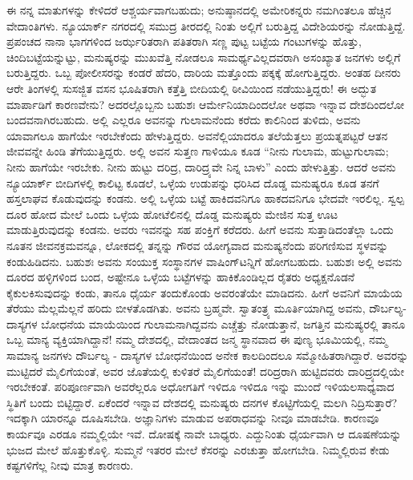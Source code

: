 ಈ ನನ್ನ ಮಾತುಗಳನ್ನು ಕೇಳಿದರೆ ಆಶ್ಚರ್ಯವಾಗಬಹುದು; ಅನುಷ್ಠಾನದಲ್ಲಿ ಅಮೇರಿಕನ್ನರು ನಮಗಿಂತಲೂ ಹೆಚ್ಚಿನ ವೇದಾಂತಿಗಳು. ನ್ಯೂಯಾರ್ಕ್​ ನಗರದಲ್ಲಿ ಸಮುದ್ರ ತೀರದಲ್ಲಿ ನಿಂತು ಅಲ್ಲಿಗೆ ಬರುತ್ತಿದ್ದ ವಿದೇಶಿಯರನ್ನು ನೋಡುತ್ತಿದ್ದೆ. ಪ್ರಪಂಚದ ನಾನಾ ಭಾಗಗಳಿಂದ ಜರ್ಝರಿತರಾಗಿ ಪತಿತರಾಗಿ ಸಣ್ಣ ಪುಟ್ಟ ಬಟ್ಟೆಯ ಗಂಟುಗಳನ್ನು ಹೊತ್ತು, ಚಿಂದಿಬಟ್ಟೆಯನ್ನುಟ್ಟು, ಮನುಷ್ಯರನ್ನು ಮುಖವೆತ್ತಿ ನೋಡಲೂ ಸಾಮರ್ಥ್ಯವಿಲ್ಲದವರಾಗಿ ಅಸಂಖ್ಯಾತ ಜನಗಳು ಅಲ್ಲಿಗೆ ಬರುತ್ತಿದ್ದರು. ಒಬ್ಬ ಪೋಲೀಸರನ್ನು ಕಂಡರೆ ಹೆದರಿ, ದಾರಿಯ ಮತ್ತೊಂದು ಪಕ್ಕಕ್ಕೆ ಹೋಗುತ್ತಿದ್ದರು. ಅಂತಹ ದೀನರು ಆರೇ ತಿಂಗಳಲ್ಲಿ ಸುಸಜ್ಜಿತ ವಸನ ಭೂಷಿತರಾಗಿ ಕತ್ತೆತ್ತಿ ಬೀದಿಯಲ್ಲಿ ಠೀವಿಯಿಂದ ನಡೆಯುತ್ತಿದ್ದರು! ಈ ಅದ್ಭುತ ಮಾರ್ಪಾಡಿಗೆ ಕಾರಣವೇನು? ಅದರಲ್ಲೊಬ್ಬನು ಬಹುಶಃ ಆರ್ಮೇನಿಯಾದಿಂದಲೋ ಅಥವಾ ಇನ್ನಾವ ದೇಶದಿಂದಲೋ ಬಂದವನಾಗಿರಬಹುದು. ಅಲ್ಲಿ ಎಲ್ಲರೂ ಅವನನ್ನು ಗುಲಾಮನೆಂದು ಕರೆದು ಕಾಲಿನಿಂದ ತುಳಿದು, ಅವನು ಯಾವಾಗಲೂ ಹಾಗೆಯೇ ಇರಬೇಕೆಂದು ಹೇಳುತ್ತಿದ್ದರು. ಅವನೆಲ್ಲಿಯಾದರೂ ತಲೆಯೆತ್ತಲು ಪ್ರಯತ್ನಪಟ್ಟರೆ ಆತನ ಜೀವವನ್ನೇ ಹಿಂಡಿ ತೆಗೆಯುತ್ತಿದ್ದರು. ಅಲ್ಲಿ ಅವನ ಸುತ್ತಣ ಗಾಳಿಯೂ ಕೂಡ “ನೀನು ಗುಲಾಮ, ಹುಟ್ಟುಗುಲಾಮ; ನೀನು ಹಾಗೆಯೇ ಇರಬೇಕು. ನೀನು ಹುಟ್ಟು ದರಿದ್ರ, ದಾರಿದ್ರ್ಯವೇ ನಿನ್ನ ಬಾಳು” ಎಂದು ಹೇಳುತ್ತಿತ್ತು. ಆದರೆ ಅವನು ನ್ಯೂಯಾರ್ಕ್​ ಬೀದಿಗಳಲ್ಲಿ ಕಾಲಿಟ್ಟ ಕೂಡಲೆ, ಒಳ್ಳೆಯ ಉಡುಪನ್ನು ಧರಿಸಿದ ದೊಡ್ಡ ಮನುಷ್ಯರೂ ಕೂಡ ತನಗೆ ಹಸ್ತಲಾಘವ ಕೊಡುವುದನ್ನು ಕಂಡನು. ಅಲ್ಲಿ ಒಳ್ಳೆಯ ಬಟ್ಟೆ ಹಾಕಿದವನಿಗೂ ಹಾಕದವನಿಗೂ ಭೇದವೇ ಇರಲಿಲ್ಲ. ಸ್ವಲ್ಪ ದೂರ ಹೋದ ಮೇಲೆ ಒಂದು ಒಳ್ಳೆಯ ಹೋಟೆಲಿನಲ್ಲಿ ದೊಡ್ಡ ಮನುಷ್ಯರು ಮೇಜಿನ ಸುತ್ತ ಊಟ ಮಾಡುತ್ತಿರುವುದನ್ನು ಕಂಡನು. ಅವರು ಇವನನ್ನು ಸಹ ಪಂಕ್ತಿಗೆ ಕರೆದರು. ಹೀಗೆ ಅವನು ಸುತ್ತಾಡಿದಂತೆಲ್ಲಾ ಒಂದು ನೂತನ ಜೀವನಕ್ರಮವನ್ನೂ, ಲೋಕದಲ್ಲಿ ತನ್ನನ್ನು ಗೌರವ ಯೋಗ್ಯವಾದ ಮನುಷ್ಯನೆಂದು ಪರಿಗಣಿಸುವ ಸ್ಥಳವನ್ನು ಕಂಡುಹಿಡಿದನು. ಬಹುಶಃ ಅವನು ಸಂಯುಕ್ತ ಸಂಸ್ಥಾನಗಳ ವಾಷಿಂಗ್​ಟನ್ನಿಗೆ ಹೋಗಬಹುದು. ಬಹುಶಃ ಅಲ್ಲಿ ಅವನು ದೂರದ ಹಳ್ಳಿಗಳಿಂದ ಬಂದ, ಅಷ್ಟೇನೂ ಒಳ್ಳೆಯ ಬಟ್ಟೆಗಳನ್ನು ಹಾಕಿಕೊಂಡಿಲ್ಲದ ರೈತರು ಅಧ್ಯಕ್ಷನೊಡನೆ ಕೈಕುಲಕಿಸುವುದನ್ನು ಕಂಡು, ತಾನೂ ಧೈರ್ಯ ತಂದುಕೊಂಡು ಅವರಂತೆಯೇ ಮಾಡಿದನು. ಹೀಗೆ ಅವನಿಗೆ ಮಾಯೆಯ ತೆರೆಯು ಮೆಲ್ಲಮೆಲ್ಲನೆ ಹರಿದು ಬೀಳತೊಡಗಿತು. ಅವನು ಬ್ರಹ್ಮವೇ. ಸ್ವಾತಂತ್ರ್ಯ ಮೂರ್ತಿಯಾಗಿದ್ದ ಅವನು, ದೌರ್ಬಲ್ಯ-ದಾಸ್ಯಗಳ ಬೋಧನೆಯ ಮಾಯೆಯಿಂದ ಗುಲಾಮನಾಗಿದ್ದವನು ಎಚ್ಚೆತ್ತು ನೋಡುತ್ತಾನೆ, ಜಗತ್ತಿನ ಮನುಷ್ಯರಲ್ಲಿ ತಾನೂ ಒಬ್ಬ ಮಾನ್ಯ ವ್ಯಕ್ತಿಯಾಗಿದ್ದಾನೆ! ನಮ್ಮ ದೇಶದಲ್ಲಿ, ವೇದಾಂತದ ಜನ್ಮ ಸ್ಥಾನವಾದ ಈ ಪುಣ್ಯ ಭೂಮಿಯಲ್ಲಿ, ನಮ್ಮ ಸಾಮಾನ್ಯ ಜನಗಳು ದೌರ್ಬಲ್ಯ - ದಾಸ್ಯಗಳ ಬೋಧನೆಯಿಂದ ಅನೇಕ ಕಾಲದಿಂದಲೂ ಸಮ್ಮೋಹಿತರಾಗಿದ್ದಾರೆ. ಅವರನ್ನು ಮುಟ್ಟಿದರೆ ಮೈಲಿಗೆಯಂತೆ, ಅವರ ಜೊತೆಯಲ್ಲಿ ಕುಳಿತರೆ ಮೈಲಿಗೆಯಂತೆ! ದರಿದ್ರರಾಗಿ ಹುಟ್ಟಿದವರು ದಾರಿದ್ರ್ಯದಲ್ಲಿಯೇ ಇರಬೇಕಂತೆ. ಪರಿಪೂರ್ಣವಾಗಿ ಅವರೆಲ್ಲರೂ ಅಧೋಗತಿಗೆ ಇಳಿದೂ ಇಳಿದೂ ಇನ್ನು ಮುಂದೆ ಇಳಿಯಲಸಾಧ್ಯವಾದ ಸ್ಥಿತಿಗೆ ಬಂದು ಬಿಟ್ಟಿದ್ದಾರೆ. ಏಕೆಂದರೆ ಇನ್ನಾವ ದೇಶದಲ್ಲಿ ಮನುಷ್ಯರು ದನಗಳ ಕೊಟ್ಟಿಗೆಯಲ್ಲಿ ಮಲಗಿ ನಿದ್ರಿಸುತ್ತಾರೆ? ಇದಕ್ಕಾಗಿ ಯಾರನ್ನೂ ದೂಷಿಸಬೇಡಿ. ಅಜ್ಞಾನಿಗಳು ಮಾಡುವ ಅಪರಾಧವನ್ನು ನೀವೂ ಮಾಡಬೇಡಿ. ಕಾರಣವೂ ಕಾರ್ಯವೂ ಎರಡೂ ನಮ್ಮಲ್ಲಿಯೇ ಇವೆ. ದೋಷಕ್ಕೆ ನಾವೇ ಬಾಧ್ಯರು. ಎದ್ದುನಿಂತು ಧೈರ್ಯವಾಗಿ ಆ ದೂಷಣೆಯನ್ನು ಭುಜದ ಮೇಲೆ ಹೊತ್ತುಕೊಳ್ಳಿ. ಸುಮ್ಮನೆ ಇತರರ ಮೇಲೆ ಕೆಸರನ್ನು ಎರಚುತ್ತಾ ಹೋಗಬೇಡಿ. ನಿಮ್ಮಲ್ಲಿರುವ ಕೇಡು ಕಷ್ಟಗಳಿಗೆಲ್ಲ ನೀವು ಮಾತ್ರ ಕಾರಣರು.

